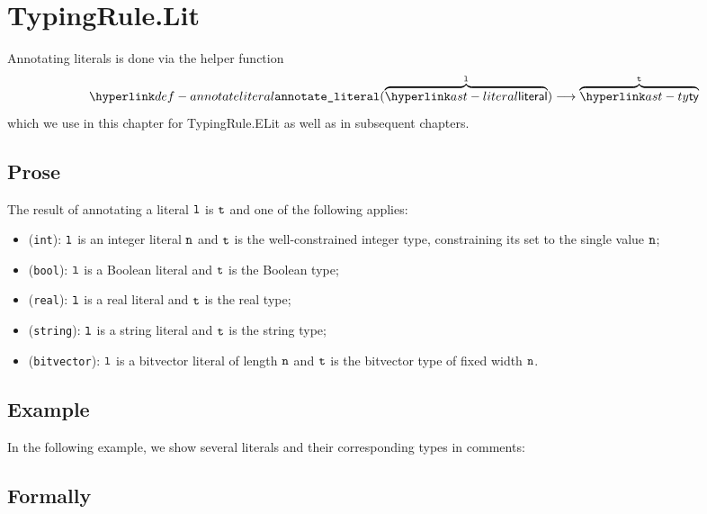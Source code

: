 
\hypertarget{def-annotateliteral}{}
\section{TypingRule.Lit \label{sec:TypingRule.Lit}}

Annotating literals is done via the helper function
\[
  \annotateliteral{\overname{\literal}{\vl}} \aslto \overname{\ty}{\vt}
\]
which we use in this chapter for TypingRule.ELit as well as in subsequent chapters.
\subsection{Prose}
The result of annotating a literal $\vl$ is $\vt$ and one of the following applies:
\begin{itemize}
\item (\texttt{int}): $\vl$ is an integer literal $\vn$ and $\vt$ is the well-constrained integer type, constraining
its set to the single value $\vn$;
\item (\texttt{bool}): $\vl$ is a Boolean literal and $\vt$ is the Boolean type;
\item (\texttt{real}): $\vl$ is a real literal and $\vt$ is the real type;
\item (\texttt{string}): $\vl$ is a string literal and $\vt$ is the string type;
\item (\texttt{bitvector}): $\vl$ is a bitvector literal of length $\vn$ and $\vt$ is the bitvector type of fixed width $\vn$.
\end{itemize}

\subsection{Example}
In the following example, we show several literals and their corresponding types in comments:


\subsection{Formally}
\begin{mathpar}
\end{mathpar}

